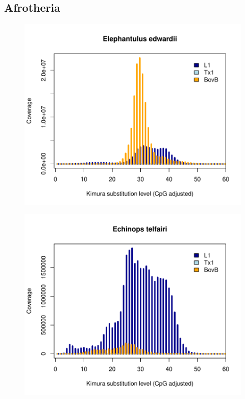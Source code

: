 \documentclass[12pt,a4paper,times]{article}
\begin{document}
\subsection*{Afrotheria}

\begin{figure}[H]
	\centering
	\includegraphics[scale=0.8]{suppFigures/divergencePlots/Elephantulus_edwardii.pdf}
	\caption{\label{Elephantulus_edwardii}}
\end{figure}

\begin{figure}[H]
	\centering
	\includegraphics[scale=0.8]{suppFigures/divergencePlots/Echinops_telfairi.pdf}
	\caption{\label{Echinops_telfairi}}
\end{figure}
\end{document}
